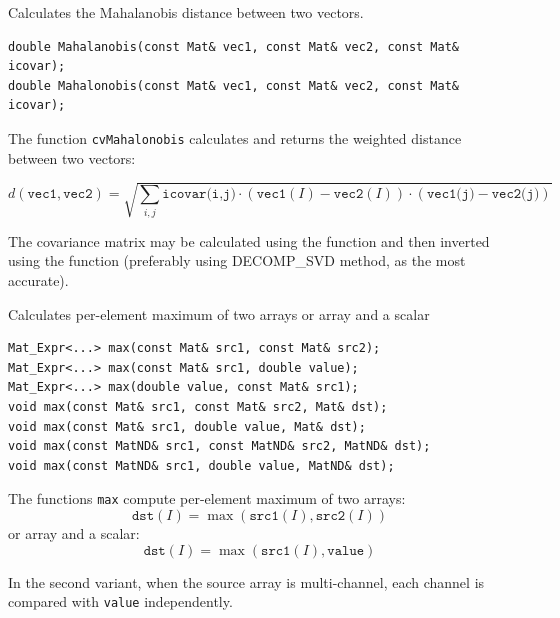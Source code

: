 \label{Mahalanobis}
Calculates the Mahalanobis distance between two vectors.

\begin{lstlisting}
double Mahalanobis(const Mat& vec1, const Mat& vec2, const Mat& icovar);
double Mahalonobis(const Mat& vec1, const Mat& vec2, const Mat& icovar);
\end{lstlisting}
\begin{description}
\end{description}

The function \texttt{cvMahalonobis} calculates and returns the weighted distance between two vectors:

\[
d(\texttt{vec1},\texttt{vec2})=\sqrt{\sum_{i,j}{\texttt{icovar(i,j)}\cdot(\texttt{vec1}(I)-\texttt{vec2}(I))\cdot(\texttt{vec1(j)}-\texttt{vec2(j)})}}
\]

The covariance matrix may be calculated using the  function and then inverted using the  function (preferably using DECOMP\_SVD method, as the most accurate).


\label{max}
Calculates per-element maximum of two arrays or array and a scalar

\begin{lstlisting}
Mat_Expr<...> max(const Mat& src1, const Mat& src2);
Mat_Expr<...> max(const Mat& src1, double value);
Mat_Expr<...> max(double value, const Mat& src1);
void max(const Mat& src1, const Mat& src2, Mat& dst);
void max(const Mat& src1, double value, Mat& dst);
void max(const MatND& src1, const MatND& src2, MatND& dst);
void max(const MatND& src1, double value, MatND& dst);
\end{lstlisting}
\begin{description}
\end{description}

The functions \texttt{max} compute per-element maximum of two arrays:
\[\texttt{dst}(I)=\max(\texttt{src1}(I), \texttt{src2}(I))\]
or array and a scalar:
\[\texttt{dst}(I)=\max(\texttt{src1}(I), \texttt{value})\]

In the second variant, when the source array is multi-channel, each channel is compared with \texttt{value} independently.

